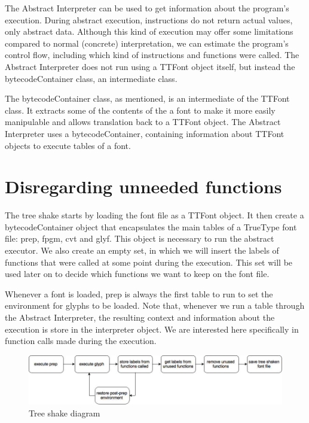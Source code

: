 \documentclass[12pt]{article}
\begin{document}
The Abstract Interpreter can be used to get information about the
program's execution. During abstract execution, instructions do not
return actual values, only abstract data. Although this kind of
execution may offer some limitations compared to normal (concrete)
interpretation, we can estimate  the program's control flow, including
which kind of instructions and functions were called. The Abstract
Interpreter does not run using a TTFont object itself, but instead the
bytecodeContainer class, an intermediate class.

The bytecodeContainer class, as mentioned, is an intermediate of
the TTFont class. It extracts some of the contents of the a font to make
it more easily manipulable and allows translation back to a TTFont
object. The Abstract Interpreter uses a bytecodeContainer, containing 
information about TTFont objects to execute tables of a font.

\section{Disregarding unneeded functions}

The tree shake starts by loading the font file as a TTFont object.
It then create a bytecodeContainer object that encapsulates the main
tables of a TrueType font file: prep, fpgm, cvt and glyf. This object 
is necessary to run the abstract executor. We also create an empty set, 
in which we will insert the labels of functions that were called at some 
point during the execution. This set will be used later on to decide 
which functions we want to keep on the font file.

Whenever a font is loaded, prep is always the first table to run to 
set the environment for glyphs to be loaded. Note that, whenever we run
a table through the Abstract Interpreter, the resulting context
and information about the execution is store in the interpreter object.
We are interested here specifically in function calls made during the execution.

\begin{figure}[ht!]
\centering
\includegraphics[width=180mm]{diagram.jpg}
\caption{Tree shake diagram \label{overflow}}
\end{figure}
\end{document}
